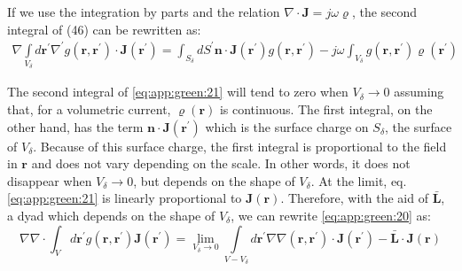 			If we use the integration by parts and the relation $\nabla\cdot\mathbf{J}=j\omega\varrho$, the second integral of (46) can be rewritten as:
			\begin{eqnarray}
				\nabla\int\limits_{V_\delta} d\mathbf{r^\prime} \nabla^\prime g(\mathbf{r},\mathbf{r^\prime})\cdot\mathbf{J}(\mathbf{r^\prime}) = \int_{S_\delta} dS^\prime \mathbf{n}\cdot\mathbf{J}(\mathbf{r^\prime})g(\mathbf{r},\mathbf{r^\prime}) - j\omega\int_{V_\delta} g(\mathbf{r},\mathbf{r^\prime})\varrho(\mathbf{r^\prime}) \label{eq:app:green:21}
			\end{eqnarray}
		
			The second integral of \eqref{eq:app:green:21} will tend to zero when $V_\delta\rightarrow0$ assuming that, for a volumetric current, $\varrho(\mathbf{r})$ is continuous. The first integral, on the other hand, has the term $\mathbf{n}\cdot\mathbf{J}(\mathbf{r^\prime})$ which is the surface charge on $S_{\delta}$, the surface of $V_\delta$. Because of this surface charge, the first integral is proportional to the field in $\mathbf{r}$ and does not vary depending on the scale. In other words, it does not disappear when $V_\delta\rightarrow0$, but depends on the shape of $V_\delta$. At the limit, eq.\eqref{eq:app:green:21} is linearly proportional to $\mathbf{J}(\mathbf{r})$. Therefore, with the aid of $\mathbf{\bar{L}}$, a dyad which depends on the shape of $V_\delta$, we can rewrite \eqref{eq:app:green:20} as:
			\begin{equation}
				\nabla\nabla\cdot\int_V d\mathbf{r^\prime} g(\mathbf{r},\mathbf{r^\prime})\mathbf{J}(\mathbf{r^\prime}) = \lim\limits_{V_\delta\rightarrow0}\int\limits_{V-V_\delta}d\mathbf{r^\prime}\nabla\nabla(\mathbf{r},\mathbf{r^\prime})\cdot\mathbf{J}(\mathbf{r^\prime})-\mathbf{\bar{L}}\cdot\mathbf{J}(\mathbf{r}) \label{eq:app:green:22}
			\end{equation}
		
